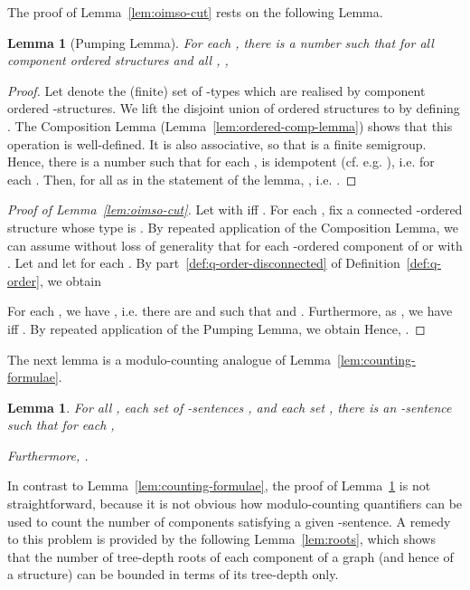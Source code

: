 \documentclass[11pt]{article}
\newtheorem{lemma}[theorem]{Lemma}
\begin{document}
The proof of Lemma~\ref{lem:oimso-cut} rests on the following Lemma.

\begin{lemma}[Pumping Lemma]
  \label{lem:pumping-lemma}
  For each , there is a number  such that for
  all component ordered structures  and all , , 
  
\end{lemma}
\begin{proof}
  Let  denote the (finite) set of -types which are
  realised by component ordered -structures.  We lift the
  disjoint union of ordered structures to  by defining
  .  The
  Composition Lemma (Lemma~\ref{lem:ordered-comp-lemma}) shows that
  this operation is well-defined.  It is also associative, so that
   is a finite semigroup.  Hence, there is a
  number  such that for each ,  is
  idempotent (cf. e.g. \cite{Howie1976}), i.e. 
  for each .  Then, for all  as in the
  statement of the lemma, ,
  i.e.  .
\end{proof}

\begin{proof}[Proof of Lemma~\ref{lem:oimso-cut}]
  Let  with
   iff .  For each ,
  fix a connected -ordered structure  whose type is
  .  By repeated application of the
  Composition Lemma, we can assume without loss of generality that
   for each -ordered component  of  or
   with .  Let 
  and let  for each . By
  part~\ref{def:q-order-disconnected} of Definition~\ref{def:q-order},
  we obtain
  
  For each , we have , i.e. there are  and
   such that  and
  . Furthermore, as
  , we have  iff
  .  By repeated application of the Pumping Lemma, we obtain
   Hence, .
\end{proof}

The next lemma is a modulo-counting analogue of
Lemma~\ref{lem:counting-formulae}.

\begin{lemma}
  \label{lem:mod-counting-formulae}
  For all , each set of -sentences
  , and each
  set , there is an
  -sentence  such that for each ,
  
  Furthermore,
  .
\end{lemma}

In contrast to Lemma~\ref{lem:counting-formulae}, the proof of
Lemma~\ref{lem:mod-counting-formulae} is not straightforward, because it is not
obvious how modulo-counting quantifiers can be used to count the number of
components satisfying a given -sentence.  A remedy to this problem is
provided by the following Lemma~\ref{lem:roots}, which shows that the number of
tree-depth roots of each component of a graph (and hence of a structure) can be
bounded in terms of its tree-depth only.
\end{document}
